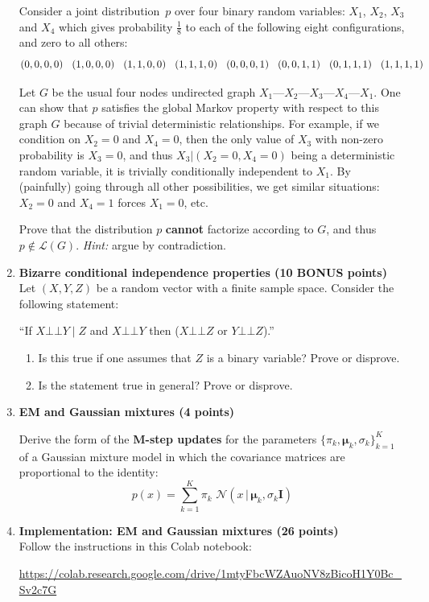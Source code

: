 \documentclass[12pt]{article}
\newcommand{\BNUM}{\begin{enumerate}}
\newcommand{\ENUM}{\end{enumerate}}
\newcommand{\1}{{\bf 1}}
\newcommand{\indep}{\bot\!\!\!\bot}
\begin{document}
\begin{enumerate}
Consider a joint distribution~$p$ over four binary random variables: $X_1$, $X_2$, $X_3$ and $X_4$ which gives probability
$\frac{1}{8}$ to each of the following eight configurations, and
zero to all others:
$$(0,0,0,0) \hspace{3mm} (1,0,0,0) \hspace{3mm} (1,1,0,0) \hspace{3mm} (1,1,1,0) \hspace{3mm} (0,0,0,1) \hspace{3mm} (0,0,1,1) \hspace{3mm} (0,1,1,1) \hspace{3mm} (1,1,1,1)$$

Let $G$ be the usual four nodes undirected graph
$X_{1}\text{---}X_{2}\text{---}X_{3}\text{---}X_{4}\text{---}X_{1}$. One can show that $p$ satisfies the 
global Markov property with respect to this graph $G$ because of trivial deterministic relationships. For example, if we condition on $X_2 = 0$ and $X_4=0$, then the only value of $X_3$ with non-zero probability is $X_3 = 0$, and thus $X_3 | (X_2=0 ,X_4=0)$ being a deterministic random variable, it is trivially conditionally independent to $X_1$. By (painfully) going through all other possibilities, we get similar situations: $X_2=0$ and $X_4=1$ forces $X_1 = 0$, etc. 

Prove that the distribution $p$ \textbf{cannot} factorize according to $G$, and thus $p \notin \mathcal{L}(G)$. \emph{Hint:} argue by contradiction.

\item {\bf Bizarre conditional independence properties (10 BONUS points)} \\ 
Let $(X,Y,Z)$ be a random vector with a finite sample space. Consider the following statement: 
\begin{center}
``If  $X \indep Y \mid Z$ and $X \indep Y$ then ($X \indep Z$ or $Y \indep Z$).''
\end{center}
\BNUM
\item Is this true if one assumes that $Z$ is a binary variable? Prove or disprove.
\item Is the statement true in general? Prove or disprove.
\ENUM 


\item {\bf EM and Gaussian mixtures (4 points)}

Derive the form of the \textbf{M-step updates} for the parameters $\{\pi_k, \boldsymbol{\mu}_k, \sigma_k\}_{k=1}^K$ of a Gaussian mixture model in which the covariance matrices are proportional to the identity:
$$p(x) = \sum_{k=1}^K \pi_k \, \, \mathcal{N}(x \, | \, \boldsymbol{\mu}_k, \sigma_k \mathbf{I} )$$


\item {\bf Implementation: EM and Gaussian mixtures (26 points)} \\

Follow the instructions in this Colab notebook:

\url{https://colab.research.google.com/drive/1mtyFbcWZAuoNV8zBicoH1Y0Bc_Sv2c7G}


\end{enumerate}
\end{document}
